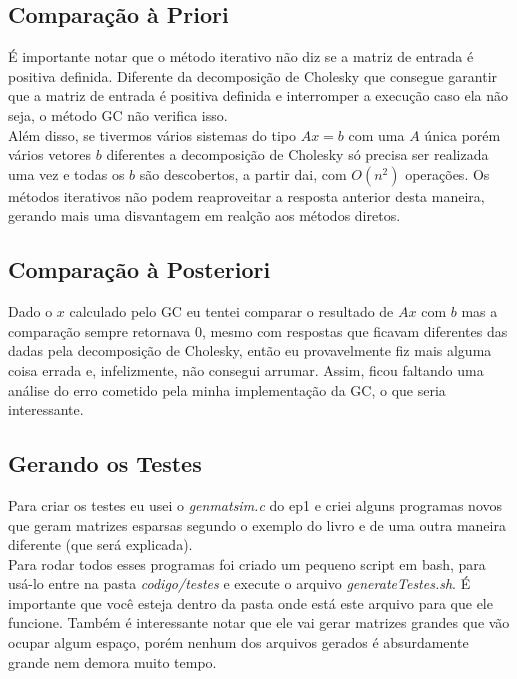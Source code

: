 \documentclass[
10pt, %
a4paper, %
oneside, %
headinclude,footinclude, %
BCOR5mm, %
]{scrartcl}
\begin{document}
\subsection{Comparação à Priori}
É importante notar que o método iterativo não diz se a matriz de entrada é positiva definida. Diferente da decomposição de Cholesky que consegue garantir que a matriz de entrada é positiva definida e interromper a execução caso ela não seja, o método GC não verifica isso. \\
Além disso, se tivermos vários sistemas do tipo $Ax = b$ com uma $A$ única porém vários vetores $b$ diferentes a decomposição de Cholesky só precisa ser realizada uma vez e todas os $b$ são descobertos, a partir dai, com $O(n^2)$ operações. Os métodos iterativos não podem reaproveitar a resposta anterior desta maneira, gerando mais uma disvantagem em realção aos métodos diretos. \\

\subsection{Comparação à Posteriori}
Dado o $x$ calculado pelo GC eu tentei comparar o resultado de $Ax$ com $b$ mas a comparação sempre retornava $0$, mesmo com respostas que ficavam diferentes das dadas pela decomposição de Cholesky, então eu provavelmente fiz mais alguma coisa errada e, infelizmente, não consegui arrumar. Assim, ficou faltando uma análise do erro cometido pela minha implementação da GC, o que seria interessante.

\subsection{Gerando os Testes}
Para criar os testes eu usei o \textit{genmatsim.c} do ep1 e criei alguns programas novos que geram matrizes esparsas segundo o exemplo do livro e de uma outra maneira diferente (que será explicada). \\
Para rodar todos esses programas foi criado um pequeno script em bash, para usá-lo entre na pasta \textit{codigo/testes} e execute o arquivo \textit{generateTestes.sh}. É importante que você esteja dentro da pasta onde está este arquivo para que ele funcione. Também é interessante notar que ele vai gerar matrizes grandes que vão ocupar algum espaço, porém nenhum dos arquivos gerados é absurdamente grande nem demora muito tempo.
\end{document}
